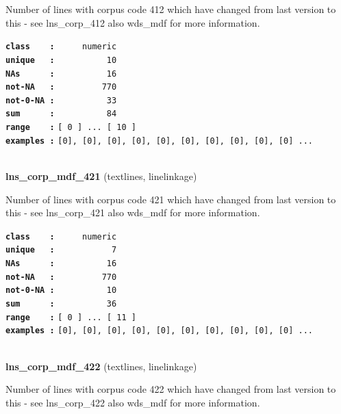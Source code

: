 \documentclass[]{article}
\begin{document}
Number of lines with corpus code 412 which have changed from last
version to this - see lns\_corp\_412 also wds\_mdf for more information.

\textbf{\texttt{class\ \ \ \ :}} \texttt{~~~~~numeric}\\
\textbf{\texttt{unique\ \ \ :}} \texttt{~~~~~~~~~~10}\\
\textbf{\texttt{NAs\ \ \ \ \ \ :}} \texttt{~~~~~~~~~~16}\\
\textbf{\texttt{not-NA\ \ \ :}} \texttt{~~~~~~~~~770}\\
\textbf{\texttt{not-0-NA\ :}} \texttt{~~~~~~~~~~33}\\
\textbf{\texttt{sum\ \ \ \ \ \ :}} \texttt{~~~~~~~~~~84}\\
\textbf{\texttt{range\ \ \ \ :}}
\texttt{{[}\ 0\ {]}\ ...\ {[}\ 10\ {]}}\\
\textbf{\texttt{examples\ :}}
\texttt{{[}0{]},\ {[}0{]},\ {[}0{]},\ {[}0{]},\ {[}0{]},\ {[}0{]},\ {[}0{]},\ {[}0{]},\ {[}0{]},\ {[}0{]}\ ...}\\

~

\textbf{lns\_corp\_mdf\_421} (textlines, linelinkage)

Number of lines with corpus code 421 which have changed from last
version to this - see lns\_corp\_421 also wds\_mdf for more information.

\textbf{\texttt{class\ \ \ \ :}} \texttt{~~~~~numeric}\\
\textbf{\texttt{unique\ \ \ :}} \texttt{~~~~~~~~~~~7}\\
\textbf{\texttt{NAs\ \ \ \ \ \ :}} \texttt{~~~~~~~~~~16}\\
\textbf{\texttt{not-NA\ \ \ :}} \texttt{~~~~~~~~~770}\\
\textbf{\texttt{not-0-NA\ :}} \texttt{~~~~~~~~~~10}\\
\textbf{\texttt{sum\ \ \ \ \ \ :}} \texttt{~~~~~~~~~~36}\\
\textbf{\texttt{range\ \ \ \ :}}
\texttt{{[}\ 0\ {]}\ ...\ {[}\ 11\ {]}}\\
\textbf{\texttt{examples\ :}}
\texttt{{[}0{]},\ {[}0{]},\ {[}0{]},\ {[}0{]},\ {[}0{]},\ {[}0{]},\ {[}0{]},\ {[}0{]},\ {[}0{]},\ {[}0{]}\ ...}\\

~

\textbf{lns\_corp\_mdf\_422} (textlines, linelinkage)

Number of lines with corpus code 422 which have changed from last
version to this - see lns\_corp\_422 also wds\_mdf for more information.
\end{document}
